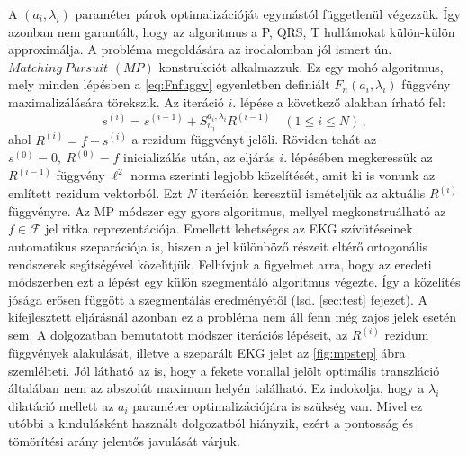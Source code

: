 \documentclass[oneside,titlepage,12pt,a4paper]{report}
\begin{document}
A $(a_i,\lambda_i)$ paraméter párok optimalizációját egymástól függetlenül végezzük. Így azonban nem garantált, hogy az algoritmus a P, QRS, T hullámokat külön-külön approximálja. A probléma megoldására az irodalomban jól ismert ún. $Matching\ Pursuit$ $(MP)$ konstrukciót \cite{mpurs} alkalmazzuk. Ez egy mohó algoritmus, mely minden lépésben a \eqref{eq:Fnfuggv} egyenletben definiált $F_n(a_i,\lambda_i)$ függvény maximalizálására törekszik. Az iteráció $i.$ lépése a következő alakban írható fel:
\begin{equation}
	s^{(i)}=s^{(i-1)} + S^{a_i,\lambda_i}_{n_i} R^{(i-1)} \quad (1\leq i \leq N)\,,
\label{eq:mpurs}
\end{equation}
ahol $R^{(i)}=f-s^{(i)}$ a rezidum függvényt jelöli. Röviden tehát az $s^{(0)}=0,\ R^{(0)}=f$ inicializálás után, az eljárás $i.$ lépésében megkeressük az $R^{(i-1)}$ függvény $\ell^2$ norma szerinti legjobb közelítését, amit ki is vonunk az említett rezidum vektorból. Ezt $N$ iteráción keresztül ismételjük az aktuális $R^{(i)}$ függvényre. Az MP módszer egy gyors algoritmus, mellyel megkonstruálható az $f\in\mathcal{F}$ jel ritka reprezentációja. Emellett lehetséges az EKG szívütéseinek automatikus szeparációja is, hiszen a jel k\"ul\"onb\"oz\H o r\'eszeit eltérő ortogon\'alis rendszerek seg\'\i ts\'eg\'evel k\"ozel\'\i tj\"uk. Felhívjuk a figyelmet arra, hogy az eredeti \cite{hexp3} módszerben ezt a lépést egy külön szegmentáló algoritmus végezte. Így a közelítés jósága erősen függött a szegmentálás eredményétől (lsd. \ref{sec:test} fejezet). A kifejlesztett eljárásnál azonban ez a probléma nem áll fenn még zajos jelek esetén sem. A dolgozatban bemutatott módszer iterációs lépéseit, az $R^{(i)}$ rezidum függvények alakulását, illetve a szeparált EKG jelet az \ref{fig:mpstep} ábra szemlélteti. Jól látható az is, hogy a fekete vonallal jelölt optimális transzláció általában nem az abszolút maximum helyén található. Ez indokolja, hogy a $\lambda_i$ dilatáció mellett az $a_i$ paraméter optimalizációjára is szükség van. Mivel ez utóbbi a kindulásként használt \cite{hexp3} dolgozatból hiányzik, ezért a pontosság és tömörítési arány jelentős javulását várjuk.
\end{document}
